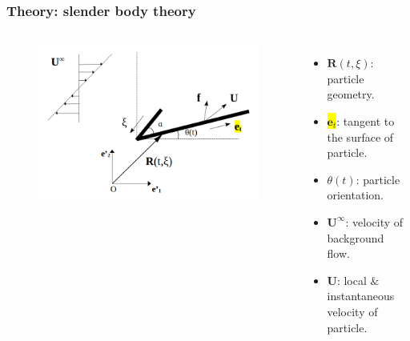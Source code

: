 \documentclass{beamer}
\newcommand{\bi}{\begin{itemize}}
\newcommand{\ei}{\end{itemize}}
\begin{document}
\begin{frame}
	\frametitle{Theory: slender body theory}
	\begin{overlayarea}{\textwidth}{\textheight}
		\vspace{-0.8cm}
		\begin{columns}
			\begin{figure}[htb]
				\begin{center}
					\includegraphics[width=1\textwidth]{plots/rigid_particle3.png}
				\end{center}
			\end{figure}
			\small \bi 
			\item $\mathbf{R}(t,\xi)$: particle geometry.
			\item \colorbox{yellow}{$\mathbf{e}_t$}: tangent to the surface of particle.
			\item $\theta(t)$: particle orientation.
			\item $\mathbf{U}^\infty$: velocity of background flow.
			\item $\mathbf{U}$: local $\&$ instantaneous velocity of particle.
			\ei
		\end{columns}\vspace{0.5cm}
	\end{overlayarea}
\end{frame}

\end{document}
